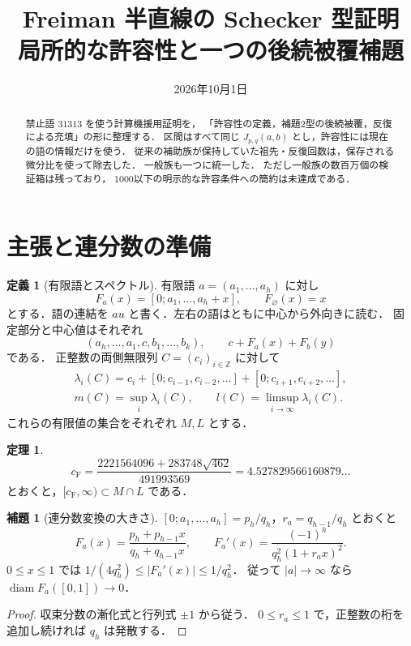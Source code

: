\documentclass[10pt,a4paper]{article}
\title{Freiman 半直線の Schecker 型証明\\
\large 局所的な許容性と一つの後続被覆補題}
\author{}
\date{2026年10月1日}
\theoremstyle{definition}
\newtheorem{definition}{定義}
\newtheorem{theorem}{定理}
\newtheorem{lemma}{補題}
\newcommand{\CF}{c_{\mathrm F}}
\newcommand{\eps}{\varnothing}
\begin{document}
\maketitle

\begin{abstract}
禁止語 $31313$ を使う計算機援用証明を，
「許容性の定義，補題2型の後続被覆，反復による充填」の形に整理する．
区間はすべて同じ $J_{p,q}(a,b)$ とし，許容性には現在の語の情報だけを使う．
従来の補助族が保持していた祖先・反復回数は，保存される微分比を使って除去した．
一般族も一つに統一した．
ただし一般族の数百万個の検証箱は残っており，
1000以下の明示的な許容条件への簡約は未達成である．
\end{abstract}

\section{主張と連分数の準備}
\begin{definition}[有限語とスペクトル]
有限語 $a=(a_1,\ldots,a_h)$ に対し
\[
 F_a(x)=[0;a_1,\ldots,a_h+x],\qquad F_\eps(x)=x
\]
とする．語の連結を $au$ と書く．左右の語はともに中心から外向きに読む．
固定部分と中心値はそれぞれ
\[
 (a_h,\ldots,a_1,c,b_1,\ldots,b_k),\qquad c+F_a(x)+F_b(y)
\]
である．
正整数の両側無限列 $C=(c_i)_{i\in\mathbb Z}$ に対して
\[
\begin{gathered}
 \lambda_i(C)=c_i+[0;c_{i-1},c_{i-2},\ldots]+[0;c_{i+1},c_{i+2},\ldots],\\
 m(C)=\sup_i\lambda_i(C),\qquad l(C)=\limsup_{i\to\infty}\lambda_i(C).
\end{gathered}
\]
これらの有限値の集合をそれぞれ $M,L$ とする．
\end{definition}

\begin{theorem}\label{thm:main}
\[
 \CF=\frac{2221564096+283748\sqrt{462}}{491993569}
     =4.527829566160879\ldots
\]
とおくと，$[\CF,\infty)\subset M\cap L$ である．
\end{theorem}

\begin{lemma}[連分数変換の大きさ]\label{lem:cf}
$[0;a_1,\ldots,a_h]=p_h/q_h$，$r_a=q_{h-1}/q_h$ とおくと
\[
 F_a(x)=\frac{p_h+p_{h-1}x}{q_h+q_{h-1}x},
 \qquad F_a'(x)=\frac{(-1)^h}{q_h^2(1+r_ax)^2}.
\]
$0\le x\le1$ では $1/(4q_h^2)\le |F_a'(x)|\le1/q_h^2$．
従って $|a|\to\infty$ なら $\operatorname{diam}F_a([0,1])\to0$．
\end{lemma}
\begin{proof}
収束分数の漸化式と行列式 $\pm1$ から従う．
$0\le r_a\le1$ で，正整数の桁を追加し続ければ $q_h$ は発散する．
\end{proof}
\end{document}
